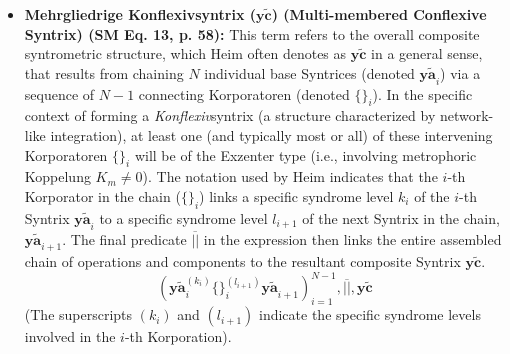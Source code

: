 \documentclass[12pt]{article}
\newcommand{\syntrix}{\bm{y\widetilde{a}}}
\newcommand{\konflexivsyntrix}{\bm{y\widetilde{c}}}
\begin{document}
\begin{itemize}
    \item \textbf{Mehrgliedrige Konflexivsyntrix (\(\konflexivsyntrix\)) (Multi-membered Conflexive Syntrix) (SM Eq. 13, p. 58):}
    This term refers to the overall composite syntrometric structure, which Heim often denotes as \( \konflexivsyntrix \) in a general sense, that results from chaining \( N \) individual base Syntrices (denoted \( \syntrix_i \)) via a sequence of \( N-1 \) connecting Korporatoren (denoted \( \{ \}_i \)). In the specific context of forming a \textit{Konflexiv}syntrix (a structure characterized by network-like integration), at least one (and typically most or all) of these intervening Korporatoren \( \{ \}_i \) will be of the Exzenter type (i.e., involving metrophoric Koppelung \(K_m \neq 0\)). The notation used by Heim indicates that the \( i \)-th Korporator in the chain (\( \{ \}_i \)) links a specific syndrome level \( k_i \) of the \(i\)-th Syntrix \( \syntrix_i \) to a specific syndrome level \( l_{i+1} \) of the next Syntrix in the chain, \( \syntrix_{i+1} \). The final predicate \( \overline{||} \) in the expression then links the entire assembled chain of operations and components to the resultant composite Syntrix \( \konflexivsyntrix \).
    \begin{equation}
    \left( \syntrix_i^{(k_i)} \{ \}_i^{(l_{i+1})} \syntrix_{i+1} \right)_{i=1}^{N-1}, \overline{||}, \konflexivsyntrix
    \label{eq:mehrgliedrige_konflexivsyntrix_original}
    \end{equation}
    (The superscripts \( (k_i) \) and \( (l_{i+1}) \) indicate the specific syndrome levels involved in the \(i\)-th Korporation).


\end{itemize}
\end{document}

